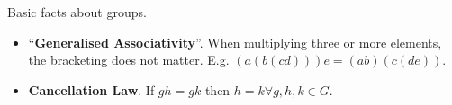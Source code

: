 \begin{properties}
    Basic facts about groups.
    \begin{itemize}
        \item ``\textbf{Generalised Associativity}''. When multiplying three or more elements, the bracketing does not matter. E.g. \((a(b(cd)))e = (ab)(c(de))\).
        \item \textbf{Cancellation Law}. If \(gh = gk\) then \(h = k \forall g, h, k \in G\).
    \end{itemize}
\end{properties}
